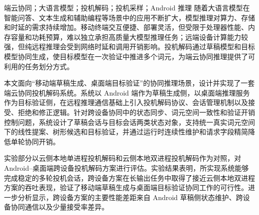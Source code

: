 \begin{中文摘要}{端云协同；大语言模型；投机解码；投机采样；Android 推理}
随着大语言模型在智能问答、文本生成和辅助编程等场景中的应用不断扩大，模型推理对算力、存储和时延的需求持续增加。移动终端交互便捷、部署灵活，但受限于处理器性能、内存容量和功耗预算，难以独立承担高质量大模型推理任务；远端设备计算能力较强，但纯远程推理会受到网络时延和调用开销影响。投机解码通过草稿模型和目标模型协同生成，使目标模型在一次验证中推进多个词元，为端云协同推理提供了可利用的任务划分方式。

本文面向“移动端草稿生成、桌面端目标验证”的协同推理场景，设计并实现了一套端云协同投机解码系统。系统以 Android 端作为草稿生成侧，以桌面端推理服务作为目标验证侧，在远程推理通信基础上引入投机解码协议、会话管理机制以及接受、拒绝和修正逻辑。针对跨设备协同中的状态同步、词元空间一致性和验证开销控制问题，系统设计了草稿会话与目标会话两类状态对象，支持统一真实词元空间下的线性提案、树形候选和目标验证，并通过运行时连续性维护和请求字段精简降低单轮协同开销。

实验部分以云侧本地单进程投机解码和云侧本地双进程投机解码作为对照，对 Android--桌面端跨设备投机解码方案进行评估。实验结果表明，所实现系统能够完成稳定的多轮投机会话，跨设备方案在长输出任务中取得了接近云侧本地双进程方案的吞吐表现，验证了移动端草稿生成与桌面端目标验证协同工作的可行性。进一步分析显示，跨设备方案的主要性能差距来自 Android 草稿侧状态维护、跨设备协同通信以及少量接受率差异。
\end{中文摘要}

